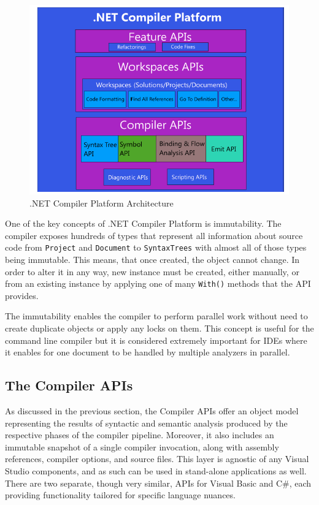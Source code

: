 \documentclass[
  digital, %
  table,   %
  lof,     %
  lot,     %
  oneside,
]{fithesis3}
\begin{document}
\begin{figure}[h!]
		\centering
			\includegraphics[scale=0.6]{img/roslyn-compiler-architecture}
		\caption{.NET Compiler Platform Architecture~\cite{roslyn-succincly}}
		\label{fig:roslyn-compiler-architecture}
\end{figure}

One of the key concepts of .NET Compiler Platform is immutability. The compiler exposes hundreds of types that represent all information about source code from \texttt{Project} and \texttt{Document} to \texttt{SyntaxTrees} with almost all of those types being immutable. This means, that once created, the object cannot change. In order to alter it in any way, new instance must be created, either manually, or from an existing instance by applying one of many \texttt{With()} methods that the API provides.

The immutability enables the compiler to perform parallel work without need to create duplicate objects or apply any locks on them. This concept is useful for the command line compiler but it is considered extremely important for IDEs where it enables for one document to be handled by multiple analyzers in parallel.

\subsection{The Compiler APIs}
As discussed in the previous section, the Compiler APIs offer an object model representing the results of syntactic and semantic analysis produced by the respective phases of the compiler pipeline. Moreover, it also includes an immutable snapshot of a single compiler invocation, along with assembly references, compiler options, and source files. This layer is agnostic of any Visual Studio components, and as such can be used in stand-alone applications as well. There are two separate, though very similar, APIs for Visual Basic and C\#, each providing functionality tailored for specific language nuances.
\end{document}
